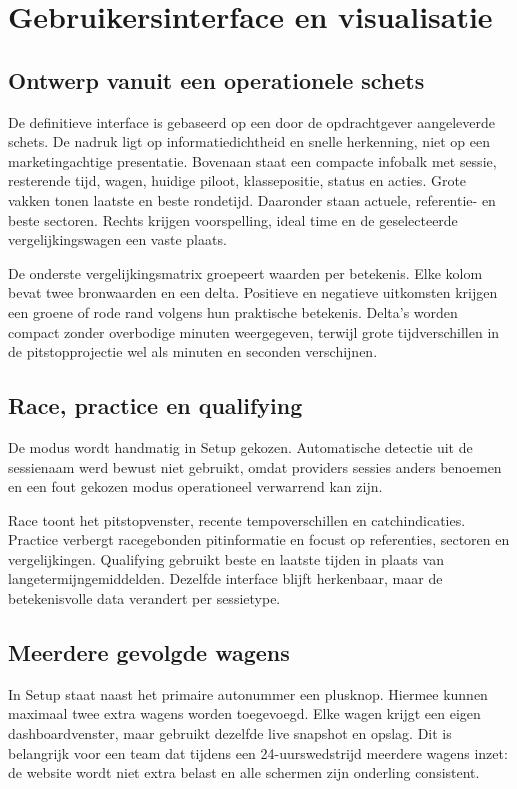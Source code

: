 
\chapter{Gebruikersinterface en visualisatie}
\label{chap:interface}
\section{Ontwerp vanuit een operationele schets}
De definitieve interface is gebaseerd op een door de opdrachtgever aangeleverde schets. De nadruk
ligt op informatiedichtheid en snelle herkenning, niet op een marketingachtige presentatie. Bovenaan
staat een compacte infobalk met sessie, resterende tijd, wagen, huidige piloot, klassepositie,
status en acties. Grote vakken tonen laatste en beste rondetijd. Daaronder staan actuele,
referentie- en beste sectoren. Rechts krijgen voorspelling, ideal time en de geselecteerde
vergelijkingswagen een vaste plaats.

De onderste vergelijkingsmatrix groepeert waarden per betekenis. Elke kolom bevat twee bronwaarden
en een delta. Positieve en negatieve uitkomsten krijgen een groene of rode rand volgens hun
praktische betekenis. Delta's worden compact zonder overbodige minuten weergegeven, terwijl grote
tijdverschillen in de pitstopprojectie wel als minuten en seconden verschijnen.

\section{Race, practice en qualifying}
De modus wordt handmatig in Setup gekozen. Automatische detectie uit de sessienaam werd bewust niet
gebruikt, omdat providers sessies anders benoemen en een fout gekozen modus operationeel verwarrend
kan zijn.

Race toont het pitstopvenster, recente tempoverschillen en catchindicaties. Practice verbergt
racegebonden pitinformatie en focust op referenties, sectoren en vergelijkingen. Qualifying gebruikt
beste en laatste tijden in plaats van langetermijngemiddelden. Dezelfde interface blijft herkenbaar,
maar de betekenisvolle data verandert per sessietype.

\section{Meerdere gevolgde wagens}
In Setup staat naast het primaire autonummer een plusknop. Hiermee kunnen maximaal twee extra wagens
worden toegevoegd. Elke wagen krijgt een eigen dashboardvenster, maar gebruikt dezelfde live
snapshot en opslag. Dit is belangrijk voor een team dat tijdens een 24-uurswedstrijd meerdere wagens
inzet: de website wordt niet extra belast en alle schermen zijn onderling consistent.

